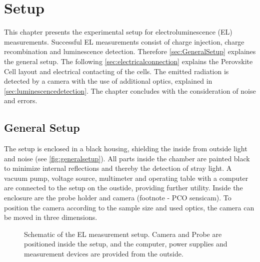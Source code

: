 \chapter{Setup}
This chapter presents the experimental setup for electroluminescence (EL) measurements. Successful EL measurements consist of charge injection, charge recombination and luminescence detection. Therefore \autoref{sec:GeneralSetup} explaines the general setup. The following \autoref{sec:electricalconnection} explains the Perovskite Cell layout and electrical contacting of the cells. The emitted radiation is detected by a camera with the use of additional optics,  explained in \autoref{sec:luminescencedetection}. The chapter concludes with the consideration of noise and errors.

\section{General Setup}\label{sec:GeneralSetup}
The setup is enclosed in a black housing, shielding the inside from outside light and noise (see \autoref{fig:generalsetup}). All parts inside the chamber are painted black to minimize internal reflections and thereby the detection of stray light. A vacuum pump, voltage source, multimeter and operating table with a computer are connected to the setup on the oustide, providing further utility. Inside the enclosure are the probe holder and camera (footnote - PCO sensicam). To position the camera according to the sample size and used optics, the camera can be moved in three dimensions.
\begin{figure}[h]
	\centering
	
	\caption{Schematic of the EL measurement setup. Camera and Probe are positioned inside the setup, and the computer, power supplies and measurement devices are provided from the outside.}
	\label{fig:generalsetup}
\end{figure}

